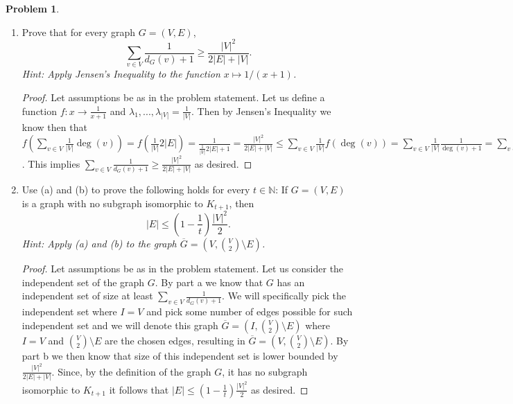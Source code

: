 \documentclass[11pt, letter]{amsart}
\theoremstyle{definition}
\newtheorem{problem}{Problem}[]
\begin{document}
\begin{problem}
\begin{enumerate}[label=(\alph*)]
  \item Prove that for every graph $G = (V, E)$,
    \begin{equation*}
      \sum_{v\in V}\frac{1}{d_G(v) + 1} \geq \frac{|V|^2}{2|E| + |V|}.
    \end{equation*}
    \textit{Hint: Apply Jensen's Inequality to the function $x \mapsto 1 / (x + 1)$.}

    \begin{proof}
        Let assumptions be as in the problem statement. Let us define a function $f: x \to \frac{1}{x + 1}$ and $\lambda_1, ..., \lambda_{\left|V\right|} = \frac{1}{\left|V\right|}$. Then by Jensen's Inequality we know then that $f(\sum_{v\in V}\frac{1}{\left|V\right|}\deg(v)) = f(\frac{1}{\left|V\right|}2\left|E\right|) = \frac{1}{\frac{1}{\left|V\right|}2\left|E\right| + 1} = \frac{\left|V\right|^2}{2\left|E\right| + \left|V\right|} \leq \sum_{v\in V} \frac{1}{\left|V\right|} f(\deg(v)) = \sum_{v\in V} \frac{1}{\left|V\right|} \frac{1}{\deg(v) + 1} = \sum_{v\in V} \frac{1}{\deg(v) + 1}$. This implies $\sum_{v\in V}\frac{1}{d_G(v) + 1} \geq \frac{|V|^2}{2|E| + |V|}$ as desired.
    \end{proof}
    
\item Use (a) and (b) to prove the following holds for every $t \in \mathbb N$: If $G = (V, E)$ is a graph with no subgraph isomorphic to $K_{t+1}$, then
  \begin{equation*}
    |E| \leq \left(1 - \frac{1}{t}\right)\frac{|V|^2}{2}.
  \end{equation*}
  \textit{Hint: Apply (a) and (b) to the graph $\overline G = \left(V, \binom{V}{2}\setminus E\right)$.}

    \begin{proof}
        Let assumptions be as in the problem statement. Let us consider the independent set of the graph $G$. By part a we know that $G$ has an independent set of size at least $\sum_{v\in V} \frac{1}{d_G(v) + 1}$. We will specifically pick the independent set where $I = V$ and pick some number of edges possible for such independent set and we will denote this graph $\overline{G} = (I, \binom{V}{2} \setminus E)$ where $I = V$ and $\binom{V}{2}\setminus E$ are the chosen edges, resulting in $\overline{G} = (V, \binom{V}{2}\setminus E)$. By part b we then know that size of this independent set is lower bounded by $\frac{\left|V\right|^2}{2\left|E\right| + \left|V\right|}$. Since, by the definition of the graph $G$, it has no subgraph isomorphic to $K_{t + 1}$ it follows that $\left|E\right| \leq (1 - \frac{1}{t})\frac{\left|V\right|^2}{2}$ as desired.
    \end{proof}
  
\end{enumerate}
\end{problem}
\end{document}
